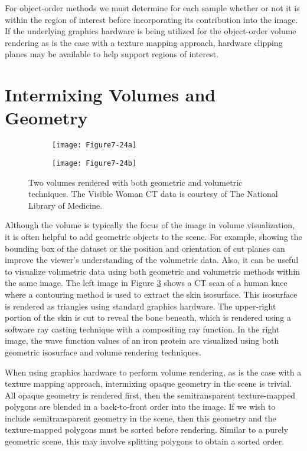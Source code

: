 For object-order methods we must determine for each sample whether or not it is within the region of interest before incorporating its contribution into the image. If the underlying graphics hardware is being utilized for the object-order volume rendering as is the case with a texture mapping approach, hardware clipping planes may be available to help support regions of interest.

\section{Intermixing Volumes and Geometry}

\begin{figure}[!htb]
	\centering
	\begin{subfigure}{0.48\linewidth}
		\centering
		\texttt{[image: Figure7-24a]}
		\caption*{}\label{fig:Figure7-24a}
	\end{subfigure}
	\hfill
	\begin{subfigure}{0.48\linewidth}
		\centering
		\texttt{[image: Figure7-24b]}
		\caption*{}\label{fig:Figure7-24b}
	\end{subfigure}%
	\caption{Two volumes rendered with both geometric and volumetric techniques. The Visible Woman CT data is courtesy of The National Library of Medicine.}
	\label{fig:Figure7-24}
\end{figure}

Although the volume is typically the focus of the image in volume visualization, it is often helpful to add geometric objects to the scene. For example, showing the bounding box of the dataset or the position and orientation of cut planes can improve the viewer's understanding of the volumetric data. Also, it can be useful to visualize volumetric data using both geometric and volumetric methods within the same image. The left image in Figure \ref{fig:Figure7-24} shows a CT scan of a human knee where a contouring method is used to extract the skin isosurface. This isosurface is rendered as triangles using standard graphics hardware. The upper-right portion of the skin is cut to reveal the bone beneath, which is rendered using a software ray casting technique with a compositing ray function. In the right image, the wave function values of an iron protein are visualized using both geometric isosurface and volume rendering techniques.

When using graphics hardware to perform volume rendering, as is the case with a texture mapping approach, intermixing opaque geometry in the scene is trivial. All opaque geometry is rendered first, then the semitransparent texture-mapped polygons are blended in a back-to-front order into the image. If we wish to include semitransparent geometry in the scene, then this geometry and the texture-mapped polygons must be sorted before rendering. Similar to a purely geometric scene, this may involve splitting polygons to obtain a sorted order.

